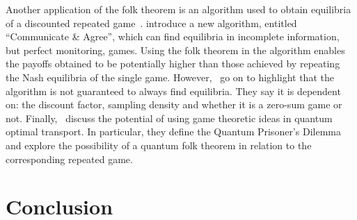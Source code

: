 Another application of the folk theorem is an algorithm used to obtain
equilibria of a discounted repeated game~\cite{Parras2020}. \cite{Parras2020}
introduce a new algorithm, entitled ``Communicate & Agree'', which can find
equilibria in incomplete information, but perfect monitoring, games. Using the
folk theorem in the algorithm enables the payoffs obtained to be potentially
higher than those achieved by repeating the Nash equilibria of the single game.
However,~\cite{Parras2020} go on to highlight that the algorithm is not
guaranteed to always find equilibria. They say it is dependent on: the discount
factor, sampling density and whether it is a zero-sum game or not.
Finally,~\cite{Ikeda2020} discuss the potential of using game theoretic ideas in
quantum optimal transport. In particular, they define the Quantum Prisoner's
Dilemma and explore the possibility of a quantum folk theorem in relation to the
corresponding repeated game.


\section{Conclusion}\label{sec:Conclusion}





